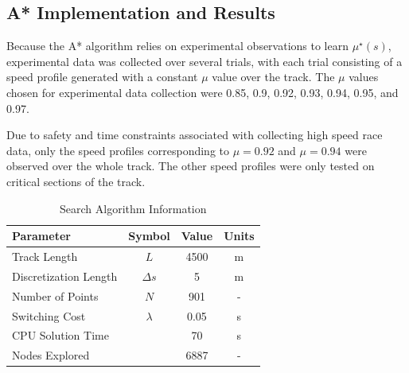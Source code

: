 \documentclass[9pt,shortpaper,twoside,web]{ieeecolor}
\begin{document}
\subsection{A* Implementation and Results}

Because the A* algorithm relies on experimental observations to learn $\mu^\star(s)$, experimental data was collected over several trials, with
each trial consisting of a speed profile generated with a constant $\mu$ value over the track. The $\mu$ values chosen for
experimental data collection were 0.85, 0.9, 0.92, 0.93, 0.94, 0.95, and 0.97. 

Due to safety and time constraints associated with collecting high speed race data, only the speed profiles corresponding to $\mu = 0.92$ and $\mu = 0.94$ were observed
over the whole track. The other speed profiles were only tested on critical sections of the track. 


\begin{table}[h]
\begin{center}
\caption{Search Algorithm Information}\label{tb:astarparams}
\begin{tabular}{lccc}
Parameter & Symbol & Value & Units \\\hline
Track Length       & $L$           &  4500 & $\mathrm{m} $ \\
Discretization Length               & $\Delta s$  & 5 & $\mathrm{m}$\\
Number of Points  & $N$                        & 901 & -\\
Switching Cost          & $\lambda$                        & 0.05   & s\\\hline
CPU Solution Time           &                                  &  70    & s \\
Nodes Explored              &                                  &  6887  & - \\\hline
\end{tabular}
\end{center}
\end{table}

\end{document}
